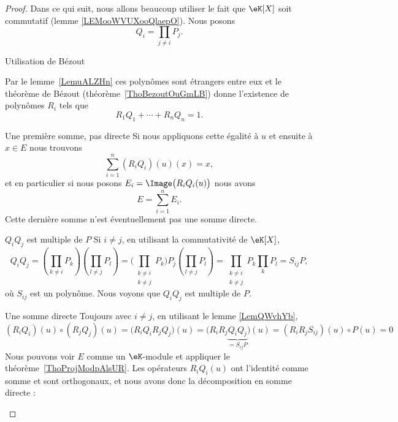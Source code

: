 \begin{proof}
    Dans ce qui suit, nous allons beaucoup utiliser le fait que \( \eK[X]\) soit commutatif (lemme \ref{LEMooWVUXooQlaepO}). Nous posons
    \begin{equation}
        Q_i=\prod_{j\neq i}P_j.
    \end{equation}
    \begin{subproof}
    \item[Utilisation de Bézout]
        
    Par le lemme~\ref{LemuALZHn} ces polynômes sont étrangers entre eux et le théorème de Bézout (théorème~\ref{ThoBezoutOuGmLB}) donne l'existence de polynômes \( R_i\) tels que
    \begin{equation}        \label{EQooMMCVooRzlXpA}
        R_1Q_1+\cdots+R_nQ_n=1.
    \end{equation}
\item[Une première somme, pas directe]
    Si nous appliquons cette égalité à \( u\) et ensuite à \( x\in E\) nous trouvons
    \begin{equation}        \label{EqqVcpUy}
        \sum_{i=1}^n(R_iQ_i)(u)(x)=x,
    \end{equation}
    et en particulier si nous posons \( E_i=\Image\big(R_iQ_i(u)\big)\) nous avons
    \begin{equation}
        E=\sum_{i=1}^nE_i.
    \end{equation}
    Cette dernière somme n'est éventuellement pas une somme directe. 
\item[\( Q_iQ_j\) est multiple de \( P\)]
    Si \( i\neq j\), en utilisant la commutativité de \( \eK[X]\),
    \begin{equation}
        Q_iQ_j=\left(\prod_{k\neq i}P_k\right)\left(\prod_{l\neq j}P_l\right)=\Big( \prod_{\substack{k\neq i\\k\neq j}}P_k \Big)P_j\left( \prod_{l\neq j}P_l \right)=\prod_{\substack{k\neq i\\k\neq j}}P_k\prod_kP_l=S_{ij}P,
    \end{equation}
    où \( S_{ij}\) est un polynôme. Nous voyons que \( Q_iQ_j\) est multiple de \( P\).
\item[Une somme directe]
    Toujours avec \( i\neq j\), en utilisant le lemme \ref{LemQWvhYb}, 
    \begin{equation}
        (R_iQ_i)(u)\circ (R_jQ_j)(u)=\big( R_iQ_iR_jQ_j \big)(u)=\big( R_iR_j\underbrace{Q_iQ_j}_{=S_{ij}P} \big)(u)=(R_iR_jS_{ij})(u)\circ P(u)=0
    \end{equation}
    Nous pouvons voir \( E\) comme un \( \eK\)-module et appliquer le théorème~\ref{ThoProjModpAlsUR}. Les opérateurs \( R_iQ_i(u)\) ont l'identité comme somme et sont orthogonaux, et nous avons donc la décomposition en somme directe :

\end{subproof}
\end{proof}
